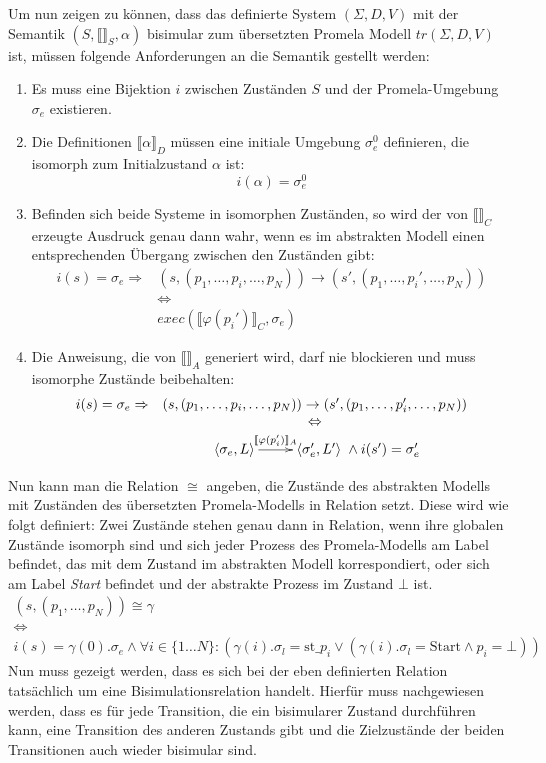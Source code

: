 Um nun zeigen zu können, dass das definierte System $(\Sigma,D,V)$ mit der Semantik $(S,\llbracket \rrbracket_S,\alpha)$ bisimular zum übersetzten Promela Modell $tr(\Sigma,D,V)$ ist, müssen folgende Anforderungen an die Semantik gestellt werden:
\begin{enumerate}
\item Es muss eine Bijektion $i$ zwischen Zuständen $S$ und der Promela-Umgebung $\sigma_e$ existieren.
\item Die Definitionen $\llbracket \alpha \rrbracket_D$ müssen eine initiale Umgebung $\sigma_e^0$ definieren, die isomorph zum Initialzustand $\alpha$ ist: 
  \[ i(\alpha) = \sigma_e^0 \]
\item Befinden sich beide Systeme in isomorphen Zuständen, so wird der von $\llbracket \rrbracket_C$ erzeugte Ausdruck genau dann wahr, wenn es im abstrakten Modell einen entsprechenden Übergang zwischen den Zuständen gibt:
  \[ \begin{array}{rc}
    i(s) = \sigma_e \Rightarrow &
    (s,(p_1,\dots,p_i,\dots,p_N))\rightarrow (s',(p_1,\dots,p_i',\dots,p_N)) \\
    & \Leftrightarrow\\
    & exec(\llbracket \varphi(p_i')\rrbracket_C,\sigma_e)
  \end{array} \]
\item Die Anweisung, die von $\llbracket \rrbracket_A$ generiert wird, darf nie blockieren und muss isomorphe Zustände beibehalten:
  \[ \begin{array}{rc}
    i(s) = \sigma_e \Rightarrow &
    (s,(p_1,\dots,p_i,\dots,p_N))\rightarrow (s',(p_1,\dots,p_i',\dots,p_N))\\
    & \Leftrightarrow\\
    & \xymatrix { \left<\sigma_e,L\right> \ar[r]^-{\llbracket \varphi(p_i')\rrbracket_A} & \left<\sigma_e',L'\right> } \land i(s') = \sigma_e'
  \end{array} \]
\end{enumerate}
Nun kann man die Relation $\cong$ angeben, die Zustände des abstrakten Modells mit Zuständen des übersetzten Promela-Modells in Relation setzt.
Diese wird wie folgt definiert:
Zwei Zustände stehen genau dann in Relation, wenn ihre globalen Zustände isomorph sind und sich jeder Prozess des Promela-Modells am Label befindet, das mit dem Zustand im abstrakten Modell korrespondiert, oder sich am Label \emph{Start} befindet und der abstrakte Prozess im Zustand $\bot$ ist.
\[
\begin{array}{c}
  (s,(p_1,\dots,p_N))\cong \gamma\\
  \Leftrightarrow\\
  i(s)=\gamma(0).\sigma_e \land \forall i\in\{1\dots N\}: (\gamma(i).\sigma_l = \textrm{st\_}p_i \lor (\gamma(i).\sigma_l = \textrm{Start}\land p_i=\bot))
\end{array}
\]
Nun muss gezeigt werden, dass es sich bei der eben definierten Relation tatsächlich um eine Bisimulationsrelation handelt.
Hierfür muss nachgewiesen werden, dass es für jede Transition, die ein bisimularer Zustand durchführen kann, eine Transition des anderen Zustands gibt und die Zielzustände der beiden Transitionen auch wieder bisimular sind.


